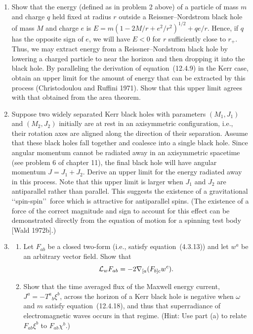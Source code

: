 \begin{enumerate}[label=\arabic*.,leftmargin=2em,itemsep=1.2ex]
\item
Show that the energy (defined as in problem 2 above) of a particle of mass \(m\) and
charge \(q\) held fixed at radius \(r\) outside a Reissner--Nordstrom black hole of
mass \(M\) and charge \(e\) is
\(E=m(1-2M/r+e^2/r^2)^{1/2}+qe/r\). Hence, if \(q\) has the opposite sign of
\(e\), we will have \(E<0\) for \(r\) sufficiently close to \(r_+\). Thus, we may
extract energy from a Reissner--Nordstrom black hole by lowering a charged particle
to near the horizon and then dropping it into the black hole. By paralleling the
derivation of equation~(12.4.9) in the Kerr case, obtain an upper limit for the
amount of energy that can be extracted by this process (Christodoulou and Ruffini
1971). Show that this upper limit agrees with that obtained from the area theorem.

\item
Suppose two widely separated Kerr black holes with parameters \((M_1,J_1)\) and
\((M_2,J_2)\) initially are at rest in an axisymmetric configuration, i.e., their
rotation axes are aligned along the direction of their separation. Assume that these
black holes fall together and coalesce into a single black hole. Since angular momentum
cannot be radiated away in an axisymmetric spacetime (see problem 6 of chapter 11),
the final black hole will have angular momentum \(J=J_1+J_2\). Derive an upper
limit for the energy radiated away in this process. Note that this upper limit is larger
when \(J_1\) and \(J_2\) are antiparallel rather than parallel. This suggests the
existence of a gravitational \lq\lq spin-spin\rq\rq\ force which is attractive for
antiparallel spins. (The existence of a force of the correct magnitude and sign to
account for this effect can be demonstrated directly from the equation of motion for a
spinning test body [Wald 1972b].)

\item
\begin{enumerate}[label=\alph*),leftmargin=2em,itemsep=.45ex]
\item Let \(F_{ab}\) be a closed two-form (i.e., satisfy equation~(4.3.13)) and let
\(w^a\) be an arbitrary vector field. Show that
\[
 \mathcal{L}_wF_{ab}=-2\nabla_{[a}(F_{b]c}w^c) .
\]
\item Show that the time averaged flux of the Maxwell energy current,
\(J^a=-T^a{}_b\xi^b\), across the horizon of a Kerr black hole is negative when
\(\omega\) and \(m\) satisfy equation~(12.4.18), and thus that superradiance of
electromagnetic waves occurs in that regime. (Hint: Use part (a) to relate
\(F_{ab}\xi^b\) to \(F_{ab}\chi^b\).)
\end{enumerate}
\end{enumerate}

\setcounter{footnote}{\chaptertwelvepreviousfootnote}
\endgroup
